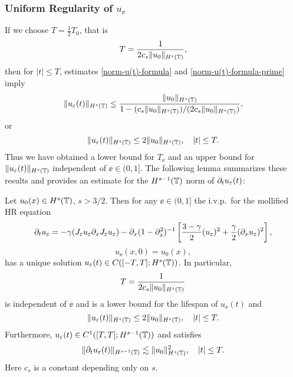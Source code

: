 \subsubsection{Uniform Regularity of $u_{\ee}$} If we choose  $T=\frac12 T_0$, that is
%
\begin{equation} 
\label{T-def}
T
=
\frac{1}{2 c_s \|u_0\|_{H^s(\mathbb{T})}},
\end{equation}
%
then for $|t| \le T$, estimates \eqref{norm-u(t)-formula} and
\eqref{norm-u(t)-formula-prime} imply 
%
\begin{equation*} 
\label{u(t)-u(0)-bound}
\|u_\varepsilon(t)\|_{H^s(\mathbb{T})}
\le
\frac{\|u_0\|_{H^s(\mathbb{T})}}{1-(c_s\|u_0\|_{H^s(\mathbb{T})})/(2 c_s \|u_0\|_{H^s(\mathbb{T})})},
\end{equation*}
%
or 
%
\begin{equation} 
\|u_\varepsilon(t)\|_{H^s(\mathbb{T})}
\le
2 \|u_0\|_{H^s(\mathbb{T})},
\quad 
|t| \le T.
\end{equation}
%
Thus we have obtained a lower bound for $T_\ee$ and an upper bound for
$\|u_\varepsilon(t)\|_{H^s(\mathbb{T})}$ independent of $\ee\in (0, 1]$. The following
lemma summarizes these results and provides an estimate for the
$H^{s-1}(\mathbb{T})$ norm of $\partial_t u_\varepsilon(t)$:
%
%
\begin{lemma}
\label{hr_wp}
Let  $u_0(x) \in  H^s(\mathbb{T})$, $s >3/2$. Then for any $\ee\in (0, 1]$
the i.v.p.\ for the mollified HR equation 
%
\begin{equation} 
\label{hr-moli-2}
\partial_t  u_\varepsilon 
=
-\gamma (J_\varepsilon u_\varepsilon \partial_x  J_\varepsilon  u_\varepsilon) - \partial_x (1-\partial_x^2)^{-1} \left
[\frac{3-\gamma}{2}(u_\varepsilon)^2 + \frac{\gamma}{2}(\partial_x u_\varepsilon)^2
\right ], 
\end{equation} 
%
\begin{equation} 
\label{burgers-moli-data-2} 
u_\ee(x, 0) = u_0 (x),
\end{equation}
%
has a unique solution $u_\varepsilon( t)\in C([-T, T]; H^s(\mathbb{T}))$. 
In particular,
%
\begin{equation} 
\label{life-est}
T
=
\frac{1}{2 c_s \|u_0\|_{H^s(\mathbb{T})}}
\end{equation}
%
is independent of $\ee$ and
is a lower bound for the lifespan of $u_\ee( t)$ and
%
\begin{equation}
\label{u-e-Hs-bound}
\|u_\varepsilon(t)\|_{H^s(\mathbb{T})}
\le
2 \|u_0 \|_{H^s(\mathbb{T})},
\quad
|t| \le T.
\end{equation}
%
Furthermore,  $u_\varepsilon( t)\in C^1([T, T]; H^{s-1}(\mathbb{T}))$ and 
satisfies
\begin{equation}
\label{dt-u-e-Hs-bound}
\|\partial_t u_\varepsilon(t)\|_{H^{s-1}(\mathbb{T})}
\lesssim
\|u_0 \|_{H^s(\mathbb{T})}^2,
\quad
|t| \le T.
\end{equation}
% 
Here  $c_s$ is a constant depending only on $s$.
\end{lemma}
